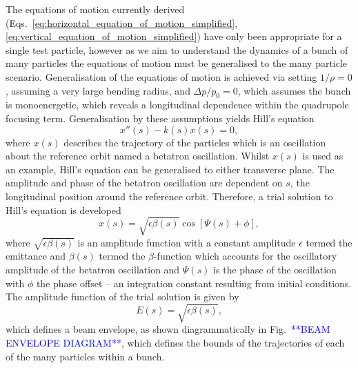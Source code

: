 \documentclass[../main.tex]{subfiles}
\begin{document}
The equations of motion currently derived (Eqs.~\ref{eq:horizontal_equation_of_motion_simplified}, \ref{eq:vertical_equation_of_motion_simplified}) have only been appropriate for a single test particle, however as we aim to understand the dynamics of a bunch of many particles the equations of motion must be generalised to the many particle scenario. Generalisation of the equations of motion is achieved via setting $1/\rho=0$, assuming a very large bending radius, and $\Delta p/p_{0}=0$, which assumes the bunch is monoenergetic, which reveals a longitudinal dependence within the quadrupole focusing term. Generalisation by these assumptions yields Hill's equation
\begin{equation}
x''\left(s\right)-k\left(s\right)x\left(s\right) = 0,
\label{eq:Hills_equation}    
\end{equation}
where $x\left(s\right)$ describes the trajectory of the particles which is an oscillation about the reference orbit named a betatron oscillation. Whilst $x\left(s\right)$ is used as an example, Hill's equation can be generalised to either transverse plane. The amplitude and phase of the betatron oscillation are dependent on $s$, the longitudinal position around the reference orbit. Therefore, a trial solution to Hill's equation is developed 
\begin{equation}
x\left(s\right) = \sqrt{\epsilon\beta\left(s\right)}\cos\left[\Psi\left(s\right)+\phi\right],
\label{eq:Hills_trial_solution}    
\end{equation}
where $\sqrt{\epsilon\beta\left(s\right)}$ is an amplitude function with a constant amplitude $\epsilon$ termed the emittance and $\beta\left(s\right)$ termed the $\beta$-function which accounts for the oscillatory amplitude of the betatron oscillation and $\Psi\left(s\right)$ is the phase of the oscillation with $\phi$ the phase offset -- an integration constant resulting from initial conditions. The amplitude function of the trial solution is given by
\begin{equation}
E\left(s\right) = \sqrt{\epsilon\beta\left(s\right)},
\label{eq:envelope_function}    
\end{equation}
which defines a beam envelope, as shown diagrammatically in Fig.~\textcolor{blue}{**BEAM ENVELOPE DIAGRAM**}, which defines the bounds of the trajectories of each of the many particles within a bunch. 
\end{document}

